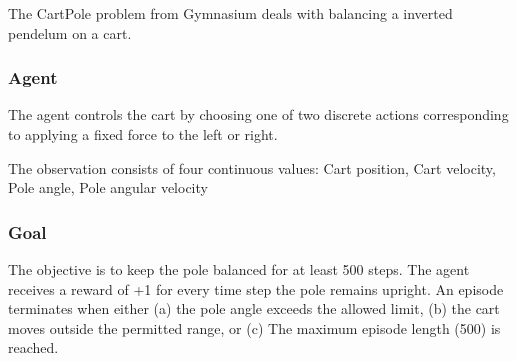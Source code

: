 The CartPole problem from Gymnasium deals with balancing a inverted pendelum on a cart.

\subsubsection{Agent}

The agent controls the cart by choosing one of two discrete actions
corresponding to applying a fixed force to the left or right.

The observation consists of four continuous values: Cart position, Cart velocity, Pole angle, Pole angular velocity

\subsubsection{Goal}

The objective is to keep the pole balanced for at least 500 steps. The agent receives a reward of +1 for every time step the pole remains upright. An episode terminates when either (a) the pole angle exceeds the allowed limit, (b) the cart moves outside the permitted range, or (c) The maximum episode length (500) is reached.